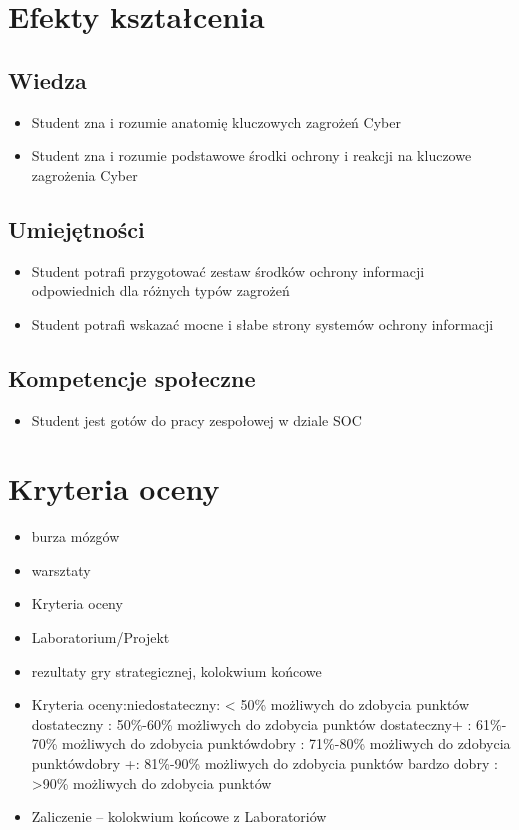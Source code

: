 \documentclass[12pt, a4paper]{article}
\begin{document}
\section{Efekty kształcenia}

\subsection*{Wiedza}
\begin{itemize}
  \item Student zna i rozumie anatomię kluczowych zagrożeń Cyber
  \item Student zna i rozumie podstawowe środki ochrony i reakcji na kluczowe zagrożenia Cyber
\end{itemize}

\subsection*{Umiejętności}
\begin{itemize}
  \item Student potrafi przygotować zestaw środków ochrony informacji odpowiednich dla różnych typów zagrożeń
  \item Student potrafi wskazać mocne i słabe strony systemów ochrony informacji
\end{itemize}

\subsection*{Kompetencje społeczne}
\begin{itemize}
  \item Student jest gotów do pracy zespołowej w dziale SOC
\end{itemize}

\section{Kryteria oceny}

\begin{itemize}
  \item burza mózgów
  \item warsztaty
  \item Kryteria oceny
  \item Laboratorium/Projekt
  \item rezultaty gry strategicznej, kolokwium końcowe
  \item Kryteria oceny:niedostateczny: < 50\% możliwych do zdobycia punktów dostateczny  :     50\%-60\% możliwych do zdobycia punktów dostateczny+ :    61\%- 70\% możliwych do zdobycia punktówdobry :                71\%-80\% możliwych do zdobycia punktówdobry +:              81\%-90\% możliwych do zdobycia punktów bardzo dobry  :   >90\%  możliwych do zdobycia punktów
  \item Zaliczenie – kolokwium końcowe z Laboratoriów
\end{itemize}
\end{document}
